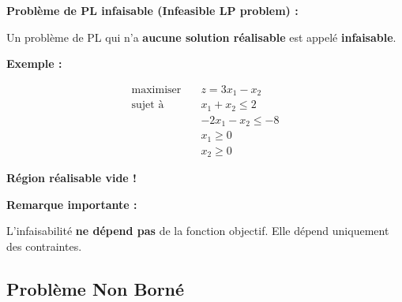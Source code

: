 \documentclass[12pt,a4paper]{article}
\begin{document}
\begin{definition}
\textbf{Problème de PL infaisable (Infeasible LP problem) :}

Un problème de PL qui n'a \textcolor{importantrouge}{\textbf{aucune solution réalisable}} est appelé \textcolor{importantrouge}{\textbf{infaisable}}.
\end{definition}

\begin{exemple}
\textbf{Exemple :}

\begin{align*}
\text{maximiser} \quad & z = 3x_1 - x_2\\
\text{sujet à} \quad & x_1 + x_2 \leq 2\\
& -2x_1 - x_2 \leq -8\\
& x_1 \geq 0\\
& x_2 \geq 0
\end{align*}

\begin{center}
\end{center}

\textcolor{importantrouge}{\textbf{Région réalisable vide !}}
\end{exemple}

\begin{important}
\textbf{Remarque importante :}

L'infaisabilité \textcolor{importantrouge}{\textbf{ne dépend pas}} de la fonction objectif. Elle dépend uniquement des contraintes.
\end{important}

\newpage
\subsection{Problème Non Borné}
\end{document}
